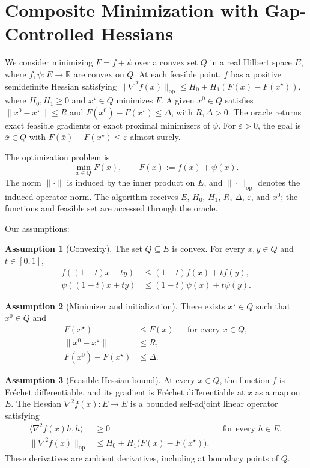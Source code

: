 \documentclass[10pt]{article}
\theoremstyle{definition}
\newtheorem{assumption}{Assumption}
\begin{document}
\section*{Composite Minimization with Gap-Controlled Hessians}
We consider minimizing $F=f+\psi$ over a convex set $Q$ in a real Hilbert space $E$, where $f,\psi:E\to\mathbb{R}$ are convex on $Q$. At each feasible point, $f$ has a positive semidefinite Hessian satisfying $\|\nabla^2 f(x)\|_{\mathrm{op}}\leq H_0+H_1(F(x)-F(x^\star))$, where $H_0,H_1\geq0$ and $x^\star\in Q$ minimizes $F$. A given $x^0\in Q$ satisfies $\|x^0-x^\star\|\leq R$ and $F(x^0)-F(x^\star)\leq\Delta$, with $R,\Delta>0$. The oracle returns exact feasible gradients or exact proximal minimizers of $\psi$. For $\varepsilon>0$, the goal is $\bar{x}\in Q$ with $F(\bar{x})-F(x^\star)\leq\varepsilon$ almost surely.

The optimization problem is
\[
\min_{x\in Q} F(x),
\qquad F(x):=f(x)+\psi(x).
\]
The norm $\|\cdot\|$ is induced by the inner product on $E$, and $\|\cdot\|_{\mathrm{op}}$ denotes the induced operator norm. The algorithm receives $E$, $H_0$, $H_1$, $R$, $\Delta$, $\varepsilon$, and $x^0$; the functions and feasible set are accessed through the oracle.

Our assumptions:
\begin{assumption}[Convexity]
The set $Q\subseteq E$ is convex. For every $x,y\in Q$ and $t\in[0,1]$,
\[
\begin{aligned}
f((1-t)x+ty)&\leq(1-t)f(x)+tf(y),\\
\psi((1-t)x+ty)&\leq(1-t)\psi(x)+t\psi(y).
\end{aligned}
\]
\end{assumption}

\begin{assumption}[Minimizer and initialization]
There exists $x^\star\in Q$ such that $x^0\in Q$ and
\[
\begin{aligned}
F(x^\star)&\leq F(x) &&\text{for every }x\in Q,\\
\|x^0-x^\star\|&\leq R,\\
F(x^0)-F(x^\star)&\leq\Delta.
\end{aligned}
\]
\end{assumption}

\begin{assumption}[Feasible Hessian bound]
At every $x\in Q$, the function $f$ is Fr\'echet differentiable, and its gradient is Fr\'echet differentiable at $x$ as a map on $E$. The Hessian $\nabla^2 f(x):E\to E$ is a bounded self-adjoint linear operator satisfying
\[
\begin{aligned}
\langle\nabla^2 f(x)h,h\rangle&\geq0 &&\text{for every }h\in E,\\
\|\nabla^2 f(x)\|_{\mathrm{op}}
&\leq H_0+H_1\bigl(F(x)-F(x^\star)\bigr).
\end{aligned}
\]
These derivatives are ambient derivatives, including at boundary points of $Q$.
\end{assumption}
\end{document}
